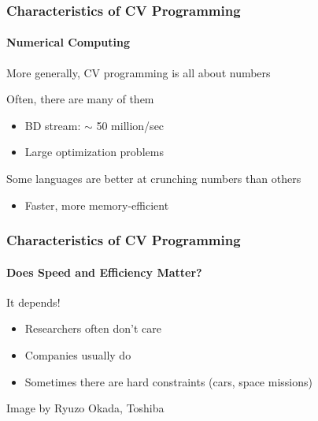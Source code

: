 \documentclass[xetex,professionalfont]{beamer}
\renewcommand\emph[1]{\textcolor{tuwcvl_inf_red}{#1}}
\begin{document}
\begin{frame}
\frametitle{Characteristics of CV Programming}
\framesubtitle{Numerical Computing}

More generally, CV programming is all about numbers

\medskip
Often, there are many of them
\begin{itemize}
	\item BD stream: $\sim$ 50 million/sec %
	\item Large optimization problems
\end{itemize}

\medskip
Some languages are better at crunching numbers than others
\begin{itemize}
	\item Faster, more memory-efficient
\end{itemize}

\end{frame}


\begin{frame}
\frametitle{Characteristics of CV Programming}
\framesubtitle{Does Speed and Efficiency Matter?}

\emph{It depends!}
\begin{itemize}
	\item Researchers often don't care %
	\item Companies usually do %
	\item Sometimes there are hard constraints (cars, space missions)
\end{itemize}

\medskip
\begin{center}
	{\centering Image by Ryuzo Okada, Toshiba}
\end{center}

\end{frame}

\end{document}
